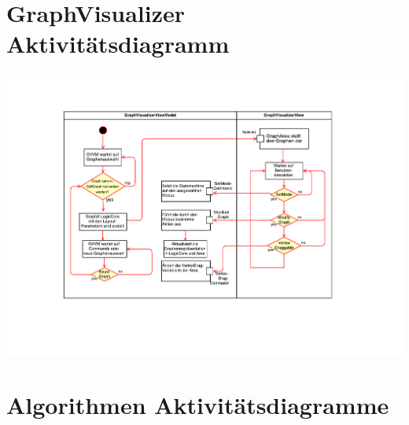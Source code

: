 \documentclass[13pt]{scrreprt}
\begin{document}
\section{GraphVisualizer Aktivitätsdiagramm}
\includegraphics[scale=0.65,center]{GraphVisualizerActivityDiagram.pdf}

\section{Algorithmen Aktivitätsdiagramme}
\end{document}
